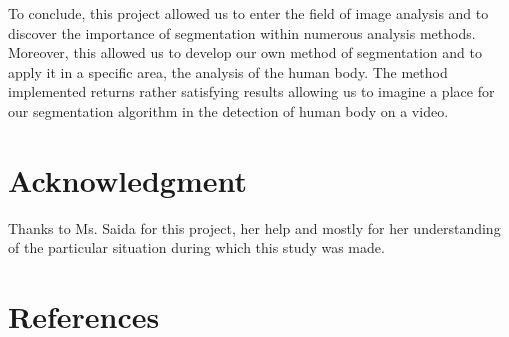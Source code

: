 \documentclass[conference]{IEEEtran}
\begin{document}
To conclude, this project allowed us to enter the field of image analysis and to discover the importance of segmentation within numerous analysis methods. Moreover, this allowed us to develop our own method of segmentation and to apply it in a specific area, the analysis of the human body. The method implemented returns rather satisfying results allowing us to imagine a place for our segmentation algorithm in the detection of human body on a video.


\section*{Acknowledgment}

Thanks to Ms. Saida for this project, her help and mostly for her understanding of the particular situation during which this study was made.

\section*{References}

\vspace{12pt}
\color{red}
\end{document}
